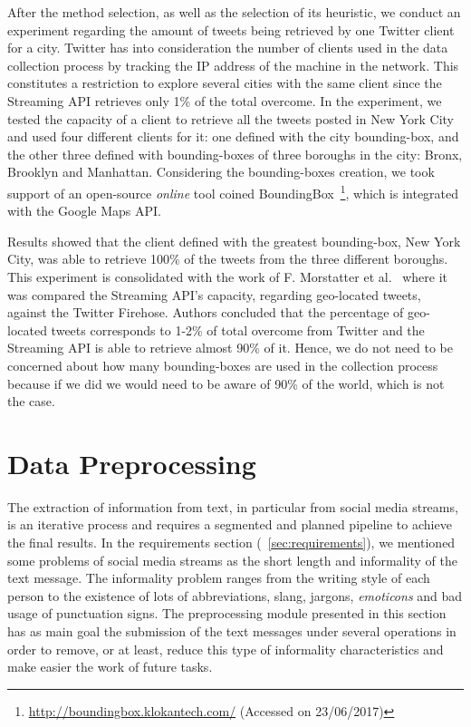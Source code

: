 After the method selection, as well as the selection of its heuristic, we conduct an experiment regarding the amount of tweets being retrieved by one Twitter client for a city. Twitter has into consideration the number of clients used in the data collection process by tracking the IP address of the machine in the network. This constitutes a restriction to explore several cities with the same client since the Streaming API retrieves only 1\% of the total overcome. In the experiment, we tested the capacity of a client to retrieve all the tweets posted in New York City and used four different clients for it: one defined with the city bounding-box, and the other three defined with bounding-boxes of three boroughs in the city: Bronx, Brooklyn and Manhattan. Considering the bounding-boxes creation, we took support of an open-source \textit{online} tool coined BoundingBox~\footnote{\url{http://boundingbox.klokantech.com/} (Accessed on 23/06/2017)}, which is integrated with the Google Maps API.

Results showed that the client defined with the greatest bounding-box, New York City, was able to retrieve 100\% of the tweets from the three different boroughs. This experiment is consolidated with the work of F. Morstatter et al.~\cite{morstatter2013sample} where it was compared the Streaming API's capacity, regarding geo-located tweets, against the Twitter Firehose. Authors concluded that the percentage of geo-located tweets corresponds to 1-2\% of total overcome from Twitter and the Streaming API is able to retrieve almost 90\% of it. Hence, we do not need to be concerned about how many bounding-boxes are used in the collection process because if we did we would  need to be aware of 90\% of the world, which is not the case.

\section{Data Preprocessing}\label{sec:data_preprocessing}
The extraction of information from text, in particular from social media streams, is an iterative process and requires a segmented and planned pipeline to achieve the final results. In the requirements section (~\ref{sec:requirements}), we mentioned some problems of social media streams as the short length and informality of the text message. The informality problem ranges from the writing style of each person to the existence of lots of abbreviations, slang, jargons, \textit{emoticons} and bad usage of punctuation signs. The preprocessing module presented in this section has as main goal the submission of the text messages under several operations in order to remove, or at least, reduce this type of informality characteristics and make easier the work of future tasks. 

